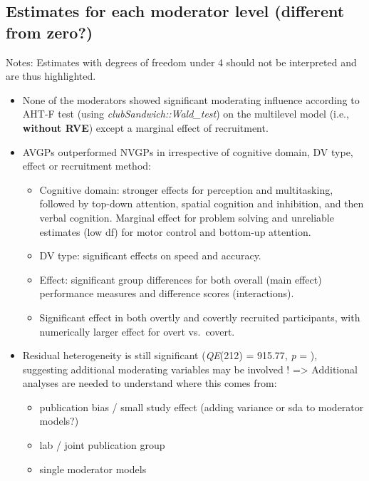 \documentclass[
]{book}
\providecommand{\tightlist}{%
  \setlength{\itemsep}{0pt}\setlength{\parskip}{0pt}}
\begin{document}
\hypertarget{estimates-for-each-moderator-level-different-from-zero}{%
\subsection{Estimates for each moderator level (different from zero?)}\label{estimates-for-each-moderator-level-different-from-zero}}

Notes: Estimates with degrees of freedom under 4 should not be interpreted and are thus highlighted.

\begin{itemize}
\item
  None of the moderators showed significant moderating influence according to AHT-F test
  (using \emph{clubSandwich::Wald\_test}) on the multilevel model (i.e., \textbf{without RVE})
  except a marginal effect of recruitment.
\item
  AVGPs outperformed NVGPs in irrespective of cognitive domain, DV type, effect or recruitment method:

  \begin{itemize}
  \tightlist
  \item
    Cognitive domain: stronger effects for perception and multitasking, followed by top-down attention,
    spatial cognition and inhibition, and then verbal cognition. Marginal effect for problem solving and
    unreliable estimates (low df) for motor control and bottom-up attention.\\
  \item
    DV type: significant effects on speed and accuracy.\\
  \item
    Effect: significant group differences for both overall (main effect) performance measures and
    difference scores (interactions).\\
  \item
    Significant effect in both overtly and covertly recruited participants, with numerically larger effect
    for overt vs.~covert.
  \end{itemize}
\item
  Residual heterogeneity is still significant (\emph{QE}(212) = 915.77,
  \emph{p} = ), suggesting additional moderating variables may be involved !
  =\textgreater{} Additional analyses are needed to understand where this comes from:

  \begin{itemize}
  \tightlist
  \item
    publication bias / small study effect (adding variance or sda to moderator models?)\\
  \item
    lab / joint publication group\\
  \item
    single moderator models
  \end{itemize}
\end{itemize}
\end{document}
